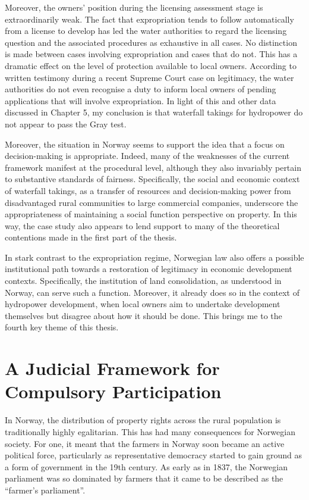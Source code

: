 Moreover, the owners' position during the licensing assessment stage is extraordinarily weak. The fact that expropriation tends to follow automatically from a license to develop has led the water authorities to regard the licensing question and the associated procedures as exhaustive in all cases. No distinction is made between cases involving expropriation and cases that do not. This has a dramatic effect on the level of protection available to local owners. According to written testimony during a recent Supreme Court case on legitimacy, the water authorities do not even recognise a duty to inform local owners of pending applications that will involve expropriation. In light of this and other data discussed in Chapter 5, my conclusion is that waterfall takings for hydropower do not appear to pass the Gray test.

Moreover, the situation in Norway seems to support the idea that a focus on decision-making is appropriate. Indeed, many of the weaknesses of the current framework manifest at the procedural level, although they also invariably pertain to substantive standards of fairness. Specifically, the social and economic context of waterfall takings, as a transfer of resources and decision-making power from disadvantaged rural communities to large commercial companies, underscore the appropriateness of maintaining a social function perspective on property. In this way, the case study also appears to lend support to many of the theoretical contentions made in the first part of the thesis.

In stark contrast to the expropriation regime, Norwegian law also offers a possible institutional path towards a restoration of legitimacy in economic development contexts. Specifically, the institution of land consolidation, as understood in Norway, can serve such a function. Moreover, it already does so in the context of hydropower development, when local owners aim to undertake development themselves but disagree about how it should be done. This brings me to the fourth key theme of this thesis.

\section{A Judicial Framework for Compulsory Participation}

In Norway, the distribution of property rights across the rural population is traditionally highly egalitarian. This has had many consequences for Norwegian society. For one, it meant that the farmers in Norway soon became an active political force, particularly as representative democracy started to gain ground as a form of government in the 19th century. As early as in 1837, the Norwegian parliament was so dominated by farmers that it came to be described as the ``farmer's parliament''.

